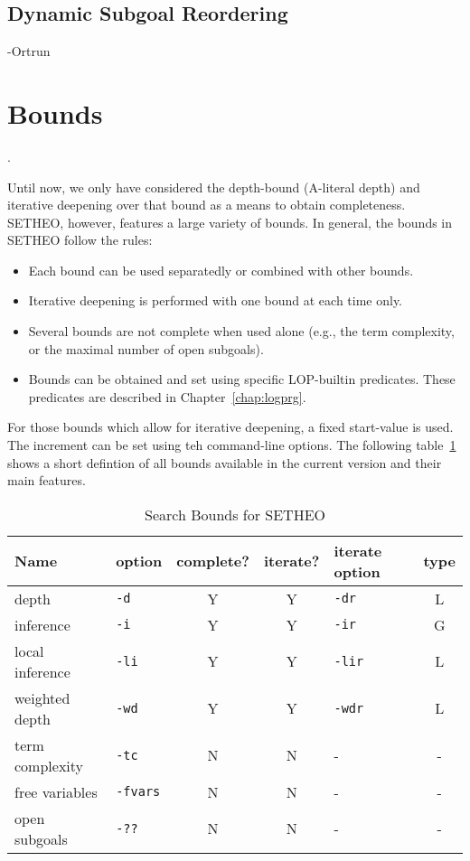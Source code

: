 \subsection{Dynamic Subgoal Reordering}

-Ortrun

\section{Bounds}
\label{sec:tut2:bounds}.

Until now, we only have considered the depth-bound (A-literal depth)
and iterative deepening over that bound as a means to obtain completeness.
SETHEO, however, features a large variety of bounds.
In general, the bounds in SETHEO follow the rules:
\begin{itemize}
\item
Each bound can be used separatedly or combined with other bounds.
\item
Iterative deepening is performed with one bound at each time only.
\item
Several bounds are not complete when used alone (e.g., the term complexity,
or the maximal number of open subgoals).
\item
Bounds can be obtained and set using specific LOP-builtin predicates.
These predicates are described in Chapter~\ref{chap:logprg}.
\end{itemize}

For those bounds which allow for iterative deepening, a fixed start-value
is used. The increment can be set using teh command-line options.
The following table~\ref{tab:tut2:bounds:list} shows a short
defintion of all bounds available in the current version and their main
features.

\begin{table}[htb]
\begin{center}
\small
\begin{tabular}{|l|l|c|c|l|c|}
\hline
Name & option & complete? & iterate? & iterate option & type \\
\hline\hline
depth & {\tt -d} & Y & Y & {\tt -dr} & L \\
inference & {\tt -i} & Y & Y & {\tt -ir} & G \\
local inference & {\tt -li} & Y & Y & {\tt -lir} & L \\
weighted depth & {\tt -wd} & Y & Y & {\tt -wdr} & L \\
\hline
term complexity & {\tt -tc} & N & N & - & - \\
free variables & {\tt -fvars} & N & N & - & - \\
open subgoals & {\tt -??} & N & N & - & - \\
\hline
\end{tabular}
\end{center}
\caption{Search Bounds for SETHEO}
\label{tab:tut2:bounds:list}
\end{table}

